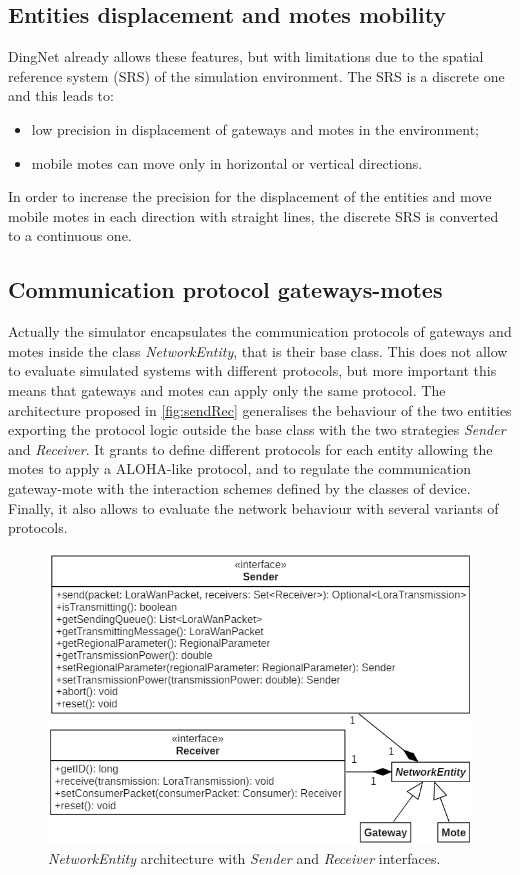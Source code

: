 \subsection*{Entities displacement and motes mobility}
DingNet already allows these features, but with limitations due to the spatial reference system (SRS) of the simulation environment. The SRS is a discrete one and this leads to:
\begin{itemize}
    \item low precision in displacement of gateways and motes in the environment;
    \item mobile motes can move only in horizontal or vertical directions. 
\end{itemize}  
In order to increase the precision for the displacement of the entities and move mobile motes in each direction with straight lines, the discrete SRS is converted to a continuous one. 

\subsection*{Communication protocol gateways-motes}

Actually the simulator encapsulates the communication protocols of gateways and motes inside the class \mbox{\textit{NetworkEntity}}, that is their base class. 
This does not allow to evaluate simulated systems with different protocols, but more important this means that gateways and motes can apply only the same protocol.
The architecture proposed in \autoref{fig:sendRec} generalises the behaviour of the two entities exporting the protocol logic outside the base class with the two strategies \mbox{\textit{Sender}} and \mbox{\textit{Receiver}}. 
It grants to define different protocols for each entity allowing the motes to apply a ALOHA-like protocol, and to regulate the communication gateway-mote with the interaction schemes defined by the classes of device.
Finally, it also allows to evaluate the network behaviour with several variants of protocols.
% 
\begin{figure}[h]
    \centering
    \includegraphics{figures/sendRec.png}
    \caption{\mbox{\textit{NetworkEntity}} architecture with \mbox{\textit{Sender}} and \mbox{\textit{Receiver}} interfaces.}
    \label{fig:sendRec}
\end{figure}
 
